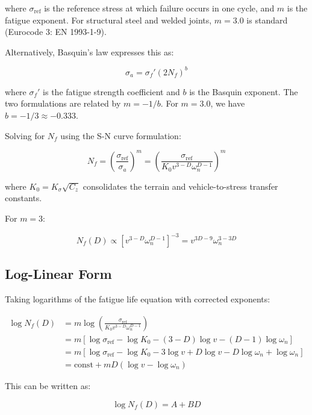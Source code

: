 \documentclass[11pt]{article}
\begin{document}
where $\sigma_{\text{ref}}$ is the reference stress at which failure occurs in one cycle, and $m$ is the fatigue exponent. For structural steel and welded joints, $m = 3.0$ is standard (Eurocode 3: EN 1993-1-9).

Alternatively, Basquin's law expresses this as:

\begin{equation}
\sigma_a = \sigma_f' (2N_f)^b
\end{equation}

where $\sigma_f'$ is the fatigue strength coefficient and $b$ is the Basquin exponent. The two formulations are related by $m = -1/b$. For $m = 3.0$, we have $b = -1/3 \approx -0.333$.

Solving for $N_f$ using the S-N curve formulation:

\begin{equation}
N_f = \left(\frac{\sigma_{\text{ref}}}{\sigma_a}\right)^m = \left(\frac{\sigma_{\text{ref}}}{K_0 v^{3-D} \omega_n^{D-1}}\right)^m
\end{equation}

where $K_0 = K_\sigma \sqrt{C_z}$ consolidates the terrain and vehicle-to-stress transfer constants.

For $m = 3$:

\begin{equation}
N_f(D) \propto [v^{3-D} \omega_n^{D-1}]^{-3} = v^{3D-9} \omega_n^{3-3D}
\end{equation}


\subsection{Log-Linear Form}

Taking logarithms of the fatigue life equation with corrected exponents:

\begin{align}
\log N_f(D) &= m \log\left(\frac{\sigma_{\text{ref}}}{K_0 v^{3-D} \omega_n^{D-1}}\right) \\
&= m[\log \sigma_{\text{ref}} - \log K_0 - (3-D)\log v - (D-1)\log \omega_n] \\
&= m[\log \sigma_{\text{ref}} - \log K_0 - 3\log v + D\log v - D\log \omega_n + \log \omega_n] \\
&= \text{const} + mD(\log v - \log \omega_n)
\end{align}

This can be written as:

\begin{equation}
\log N_f(D) = A + BD
\end{equation}
\end{document}
